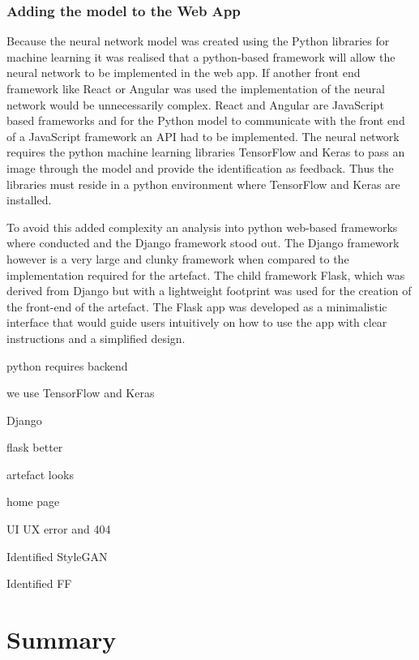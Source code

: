 \subsubsection{Adding the model to the Web App}

Because the neural network model was created using the Python libraries for machine learning it was realised that a python-based framework will allow the neural network to be implemented in the web app. If another front end framework like React or Angular was used the implementation of the neural network would be unnecessarily complex. React and Angular are JavaScript based frameworks and for the Python model to communicate with the front end of a JavaScript framework an API had to be implemented. The neural network requires the python machine learning libraries TensorFlow and Keras to pass an image through the model and provide the identification as feedback. Thus the libraries must reside in a python environment where TensorFlow and Keras are installed. 

To avoid this added complexity an analysis into python web-based frameworks where conducted and the Django framework stood out. The Django framework however is a very large and clunky framework when compared to the implementation required for the artefact. The child framework Flask, which was derived from Django but with a lightweight footprint was used for the creation of the front-end of the artefact. The Flask app was developed as a minimalistic interface that would guide users intuitively on how to use the app with clear instructions and a simplified design. 

python requires backend

we use TensorFlow and Keras

Django

flask better

artefact looks

home page

UI UX error and 404 

Identified StyleGAN

Identified FF



\section{Summary}